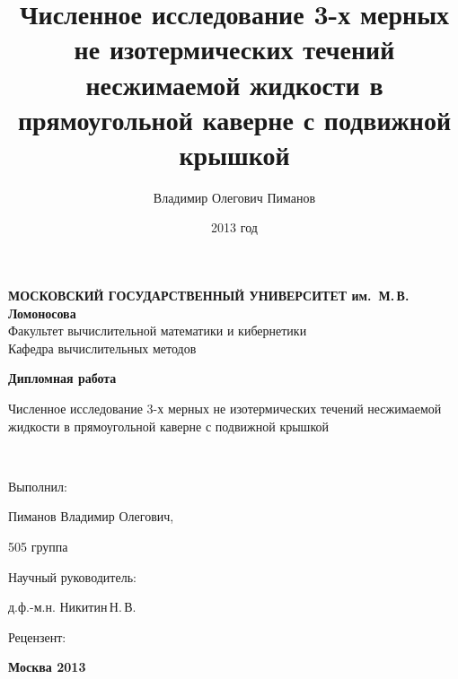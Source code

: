 \documentclass{scrartcl}
\title{Численное исследование 3-х мерных не изотермических течений несжимаемой жидкости в прямоугольной каверне с подвижной крышкой}
\author{Владимир Олегович Пиманов}
\date{2013 год}
\begin{document}

\thispagestyle{empty}
\begin{center}
{\bfseries МОСКОВСКИЙ ГОСУДАРСТВЕННЫЙ УНИВЕРСИТЕТ им.~М.{\,}В.{\,}Ломоносова}\\
\vspace{2ex}Факультет вычислительной математики и кибернетики \\
\vspace{2ex}Кафедра вычислительных методов \\
\end{center}

\vfill

\begin{center}
{\huge {\bfseries Дипломная работа

\vspace*{1cm}

Численное исследование 3-х мерных не изотермических течений несжимаемой жидкости в прямоугольной каверне с подвижной крышкой} \\[25mm]}

\end{center}

\vfill 

\hspace*{7cm} Выполнил:

\hspace*{7cm} Пиманов Владимир Олегович,

\hspace*{7cm} 505 группа

\hspace*{7cm} Научный руководитель:

\hspace*{7cm} д.ф.-м.н. Никитин{\,}Н.{\,}В.

\hspace*{7cm} Рецензент:

\hspace*{7cm} 

\bigskip

\vfill

\begin{center}
{\bfseries Москва 2013}
\end{center}

\newpage
\tableofcontents
\newpage
\end{document}
